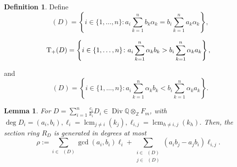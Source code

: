 \documentclass{amsart}
\theoremstyle{plain}
\newtheorem{lem}[thm]{Lemma}
\theoremstyle{definition}
\newtheorem{defn}[thm]{Definition}
\theoremstyle{remark}
\numberwithin{equation}{subsection}
\newcommand\bq{{\mathbb Q}}
\newcommand\bz{{\mathbb Z}}
\DeclareMathOperator\di{Div}
\newcommand\bida{a}
\newcommand\bidb{b}
\newcommand\hirz{F}
\DeclareMathOperator{\Te}{T_=}
\DeclareMathOperator{\Tp}{T_+}
\DeclareMathOperator{\Tm}{T_-}
\DeclareMathOperator{\lcm}{lcm}
\begin{document}
\begin{defn}
\label{defn:t-defn}
Define 
\begin{equation*}
	\Te(D) = \left\{i \in \{1, \ldots, n\}: \bida_i \sum_{k=1}^n \bidb_k 
\alpha_k = \bidb_i \sum_{k=1}^n \bida_k \alpha_k \right\},
\end{equation*}

\begin{equation*}
	\Tp(D) = \left\{ i \in \{1, \ldots, n\}\colon  \vphantom{\sum_{k = 1}^n} 
	\bida_i \sum_{k = 1}^n \alpha_k \bidb_k > \bidb_i \sum_{k = 1}^n \alpha_k \bida_k 
\right\},
\end{equation*}

\noindent
and
\begin{equation*}
	\Tm(D) = \left\{ i \in \{1, \ldots, n\}\colon \bida_i \sum_{k = 1}^n \alpha_k
	\bidb_k < \bidb_i \sum_{k=1}^n \alpha_k \bida_k \right\}.
\end{equation*}
\end{defn}

\begin{lem}
\label{lem:hirz-generators}
For $D = \sum_{i=1}^{n} \frac{c_i}{k_i}D_i \in \di \bq \otimes_\bz \hirz_m$, with $\deg D_i = (\bida_i, \bidb_i), \ell_i = \lcm_{j\neq i} (k_j), \ell_{i,j} = \lcm_{h \neq i,j} (k_h).$ Then, the section ring $R_D$ is generated in degrees at most
\begin{equation}\label{eqn:def-sigma}
	\rho := \sum_{i \in \Te(D)} \gcd(\bida_i, \bidb_i) \ell_i + \sum_{\substack
	{i \in \Tp(D) \\ j\in \Tm(D)}} (\bida_i \bidb_j - \bida_j \bidb_i)
	\ell	_{i,j}.
\end{equation}
\end{lem}
\end{document}
